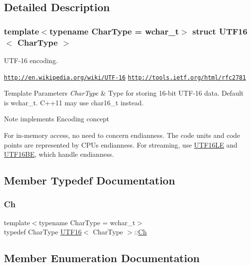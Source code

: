 \subsection{Detailed Description}
\subsubsection*{template$<$typename Char\+Type = wchar\+\_\+t$>$\newline
struct U\+T\+F16$<$ Char\+Type $>$}

U\+T\+F-\/16 encoding. 

\href{http://en.wikipedia.org/wiki/UTF-16}{\tt http\+://en.\+wikipedia.\+org/wiki/\+U\+T\+F-\/16} \href{http://tools.ietf.org/html/rfc2781}{\tt http\+://tools.\+ietf.\+org/html/rfc2781} 
\begin{DoxyTemplParams}{Template Parameters}
{\em Char\+Type} & Type for storing 16-\/bit U\+T\+F-\/16 data. Default is wchar\+\_\+t. C++11 may use char16\+\_\+t instead. \\
\hline
\end{DoxyTemplParams}
\begin{DoxyNote}{Note}
implements Encoding concept

For in-\/memory access, no need to concern endianness. The code units and code points are represented by C\+PU\textquotesingle{}s endianness. For streaming, use \hyperlink{structUTF16LE}{U\+T\+F16\+LE} and \hyperlink{structUTF16BE}{U\+T\+F16\+BE}, which handle endianness. 
\end{DoxyNote}


\subsection{Member Typedef Documentation}
\mbox{\label{structUTF16_a811680d50447c98be4fd94c0a27504bb}} 
\subsubsection{\texorpdfstring{Ch}{Ch}}
{\footnotesize\ttfamily template$<$typename Char\+Type  = wchar\+\_\+t$>$ \\
typedef Char\+Type \hyperlink{structUTF16}{U\+T\+F16}$<$ Char\+Type $>$\+::\hyperlink{structUTF16_a811680d50447c98be4fd94c0a27504bb}{Ch}}



\subsection{Member Enumeration Documentation}
\mbox{\label{structUTF16_a34817dbbc470e278ad65aff8db6ebdcf}} 
